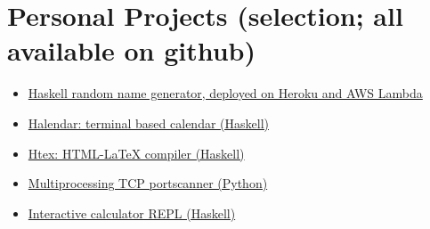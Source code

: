 \section{Personal Projects (selection; all available on github)}

\begin{itemize}
	\item \href{https://github.com/chris-bacon/randomNameGenerator}{Haskell random name generator, deployed on Heroku and AWS Lambda}
	\item \href{https://github.com/chris-bacon/halendar}{Halendar: terminal based calendar (Haskell)}
	\item \href{https://github.com/chris-bacon/Htex}{Htex: HTML-LaTeX compiler (Haskell)}
	\item \href{https://github.com/chris-bacon/portscanner}{Multiprocessing TCP portscanner (Python)}
	\item \href{https://github.com/chris-bacon/Interactive-Calculator}{Interactive calculator REPL (Haskell)}
\end{itemize}